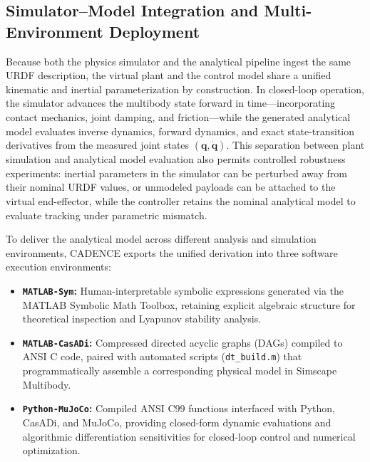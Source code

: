\documentclass[fleqn,10pt]{article}
\begin{document}
\subsection{Simulator--Model Integration and Multi-Environment Deployment} \label{subsec:sim_integration}
Because both the physics simulator and the analytical pipeline ingest the same URDF description, the virtual plant and the control model share a unified kinematic and inertial parameterization by construction. In closed-loop operation, the simulator advances the multibody state forward in time—incorporating contact mechanics, joint damping, and friction—while the generated analytical model evaluates inverse dynamics, forward dynamics, and exact state-transition derivatives from the measured joint states $(\bm{q}, \dot{\bm{q}})$. This separation between plant simulation and analytical model evaluation also permits controlled robustness experiments: inertial parameters in the simulator can be perturbed away from their nominal URDF values, or unmodeled payloads can be attached to the virtual end-effector, while the controller retains the nominal analytical model to evaluate tracking under parametric mismatch.

To deliver the analytical model across different analysis and simulation environments, CADENCE exports the unified derivation into three software execution environments:
\begin{itemize}
	\item \textbf{\texttt{MATLAB-Sym}:} Human-interpretable symbolic expressions generated via the MATLAB Symbolic Math Toolbox, retaining explicit algebraic structure for theoretical inspection and Lyapunov stability analysis.
	\item \textbf{\texttt{MATLAB-CasADi}:} Compressed directed acyclic graphs (DAGs) compiled to ANSI C code, paired with automated scripts (\texttt{dt\_build.m}) that programmatically assemble a corresponding physical model in Simscape Multibody.
	\item \textbf{\texttt{Python-MuJoCo}:} Compiled ANSI C99 functions interfaced with Python, CasADi, and MuJoCo, providing closed-form dynamic evaluations and algorithmic differentiation sensitivities for closed-loop control and numerical optimization.
\end{itemize}
\end{document}
